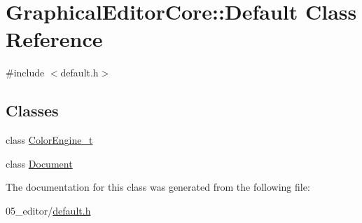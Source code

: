 \hypertarget{classGraphicalEditorCore_1_1Default}{}\section{Graphical\+Editor\+Core\+:\+:Default Class Reference}
\label{classGraphicalEditorCore_1_1Default}


{\ttfamily \#include $<$default.\+h$>$}

\subsection*{Classes}
\begin{DoxyCompactItemize}
\item 
class \hyperlink{classGraphicalEditorCore_1_1Default_1_1ColorEngine__t}{Color\+Engine\+\_\+t}
\item 
class \hyperlink{classGraphicalEditorCore_1_1Default_1_1Document}{Document}
\end{DoxyCompactItemize}


The documentation for this class was generated from the following file\+:\begin{DoxyCompactItemize}
\item 
05\+\_\+editor/\hyperlink{default_8h}{default.\+h}\end{DoxyCompactItemize}
